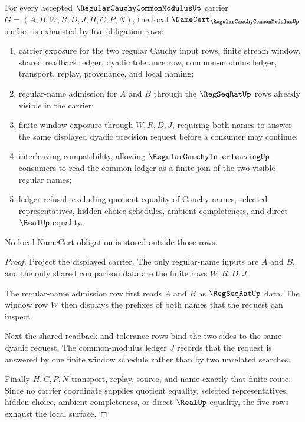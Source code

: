 \begin{theorem}
\label{thm:regular-cauchy-common-modulus-namecert-obligations}
For every accepted $\RegularCauchyCommonModulusUp$ carrier $G=(A,B,W,R,D,J,H,C,P,N)$, the local $\NameCert_{\RegularCauchyCommonModulusUp}$ surface is exhausted by five obligation rows:
\begin{enumerate}
\item carrier exposure for the two regular Cauchy input rows, finite stream window, shared readback ledger, dyadic tolerance row, common-modulus ledger, transport, replay, provenance, and local naming;
\item regular-name admission for $A$ and $B$ through the $\RegSeqRatUp$ rows already visible in the carrier;
\item finite-window exposure through $W,R,D,J$, requiring both names to answer the same displayed dyadic precision request before a consumer may continue;
\item interleaving compatibility, allowing $\RegularCauchyInterleavingUp$ consumers to read the common ledger as a finite join of the two visible regular names;
\item ledger refusal, excluding quotient equality of Cauchy names, selected representatives, hidden choice schedules, ambient completeness, and direct $\RealUp$ equality.
\end{enumerate}
No local NameCert obligation is stored outside those rows.
\end{theorem}
\begin{proof}
Project the displayed carrier. The only regular-name inputs are $A$ and $B$, and the only shared comparison data are the finite rows $W,R,D,J$.

The regular-name admission row first reads $A$ and $B$ as $\RegSeqRatUp$ data. The window row $W$ then displays the prefixes of both names that the request can inspect.

Next the shared readback and tolerance rows bind the two sides to the same dyadic request. The common-modulus ledger $J$ records that the request is answered by one finite window schedule rather than by two unrelated searches.

Finally $H,C,P,N$ transport, replay, source, and name exactly that finite route. Since no carrier coordinate supplies quotient equality, selected representatives, hidden choice, ambient completeness, or direct $\RealUp$ equality, the five rows exhaust the local surface.
\end{proof}

